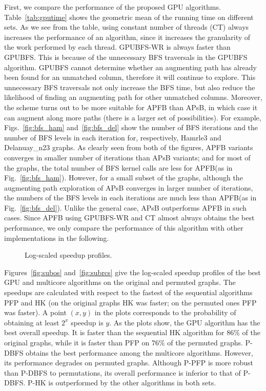 \documentclass[11pt,a4paper]{article}
\newcommand{\GPUone}{GPUBFS\xspace}
\newcommand{\GPUtwo}{GPUBFS-WR\xspace}
\newcommand{\mcpf}{P-PFP\xspace}
\newcommand{\mchk}{P-HK\xspace}
\newcommand{\mcbfs}{P-DBFS\xspace}
\newcommand{\APSBFS}{APsB\xspace}
\newcommand{\APFBFS}{APFB\xspace}
\newcommand{\altswap}{{\sc{Alternate}}\xspace}
\begin{document}
First, we compare the performance of the proposed GPU algorithms. Table~\ref{tab:gputime} 
shows the geometric mean of the running time on different sets. As we see from the table, 
using constant number of threads (CT) always increases the performance of an algorithm, since it
increases the granularity of the work performed by each thread. \GPUtwo{} is always
faster than \GPUone{}. This is because of the unnecessary BFS traversals in the \GPUone{}
algorithm. \GPUone{} cannot determine whether an augmenting path has already 
been found for an unmatched column, therefore it will continue to explore.
This unnecessary BFS traversals not only increase the BFS time, but also reduce the likelihood of
finding an augmenting path for other unmatched columns. 
Moreover, the \altswap scheme turns out to be more suitable for \APFBFS than \APSBFS, 
in which case it can augment along more paths (there is a larger 
set of possibilities). For example, Figs.~\ref{fig:bfs_ham} and~\ref{fig:bfs_del} show the number 
of BFS iterations and the number of BFS levels in each iteration for, respectively, Hamrle3 and Delanuay\_n23 graphs. 
As clearly seen from both of the figures, 
\APFBFS variants converges in smaller number of iterations than \APSBFS variants; and for most of the graphs,
the total number of BFS kernel calls are less for \APFBFS (as in Fig.~\ref{fig:bfs_ham}). 
However, for a small subset of the graphs, although the augmenting path exploration
of \APSBFS converges in larger number of iterations, the numbers of the BFS levels in each iterations
are much less than \APFBFS (as in Fig.~\ref{fig:bfs_del}). Unlike the general case,
\APSBFS outperforms \APFBFS in such cases.
Since \APFBFS using \GPUtwo{}   
and CT 
almost always obtains the best performance, we only compare the performance of this 
algorithm with other implementations in the following.

\begin{figure} [!htb]
\vspace*{-1em}
\caption{Log-scaled speedup profiles.}
\end{figure}




Figures~\ref{fig:subos} and~\ref{fig:subrcs} give the log-scaled 
speedup profiles of the best GPU and multicore algorithms on 
the original and permuted graphs. The speedups are calculated with respect to the fastest of
the sequential algorithms PFP and HK (on the original graphs HK was faster; on the permuted ones PFP was faster). 
A point $(x,y)$ in the plots corresponds to the 
probability of obtaining at least $2^x$ speedup is $y$. As the plots show, the GPU 
algorithm has the best overall speedup. It is faster than the sequential HK 
algorithm for $86 \%$ of the original graphs, while it is faster than PFP on $76 \%$
of the permuted graphs. \mcbfs obtains the best performance among the multicore algorithms.
However, its performance degrades on permuted graphs.
Although \mcpf is more robust than \mcbfs to permutations, its overall performance
is inferior to that of \mcbfs. \mchk is outperformed by the other algorithms in both sets. 
\end{document}
